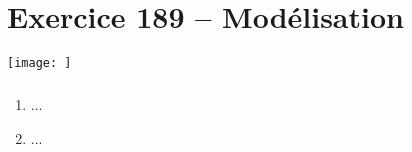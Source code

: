 \section*{Exercice 189 -- Modélisation}
\setcounter{exo}{0}


\begin{center}
\texttt{[image: ]}%
\end{center}





\subparagraph{}
 \textit{}
\ifprof
\begin{corrige}
\end{corrige}
\else
\fi


\begin{enumerate}
\item ...
\item ...
\end{enumerate}
